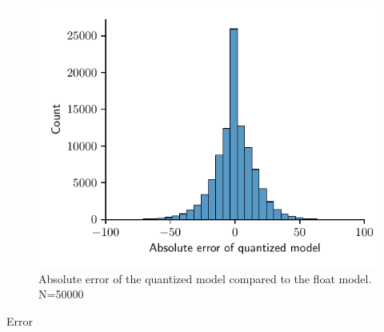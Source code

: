 \begin{figure}[H]
\centering
\includegraphics[width=12cm]{./dynamic/quant_errors.pdf}
\caption{Absolute error of the quantized model compared to the float model. N=50000}
\label{fig:quant_errors}
\end{figure}

Error
